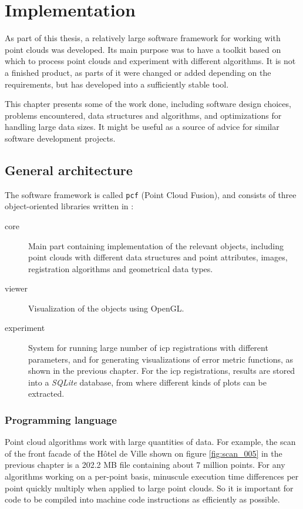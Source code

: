 \chapter{Implementation} \label{ch:implementation}
As part of this thesis, a relatively large software framework for working with point clouds was developed. Its main purpose was to have a toolkit based on which to process point clouds and experiment with different algorithms. It is not a finished product, as parts of it were changed or added depending on the requirements, but has developed into a sufficiently stable tool.

This chapter presents some of the work done, including software design choices, problems encountered, data structures and algorithms, and optimizations for handling large data sizes. It might be useful as a source of advice for similar software development projects.

\section{General architecture}
The software framework is called \texttt{pcf} (Point Cloud Fusion), and consists of three object-oriented libraries written in \cpp{}:
\begin{description}
\item[core] Main part containing implementation of the relevant objects, including point clouds with different data structures and point attributes, images, registration algorithms and geometrical data types.
\item[viewer] Visualization of the objects using OpenGL.
\item[experiment] System for running large number of \gls{icp} registrations with different parameters, and for generating visualizations of error metric functions, as shown in the previous chapter. For the \gls{icp} registrations, results are stored into a \emph{SQLite} database, from where different kinds of plots can be extracted.
\end{description}

\subsection{Programming language}
Point cloud algorithms work with large quantities of data. For example, the scan of the front facade of the Hôtel de Ville shown on figure \ref{fig:scan_005} in the previous chapter is a 202.2 MB file containing about $7$ million points. For any algorithms working on a per-point basis, minuscule execution time differences per point quickly multiply when applied to large point clouds. So it is important for code to be compiled into machine code instructions as efficiently as possible.

